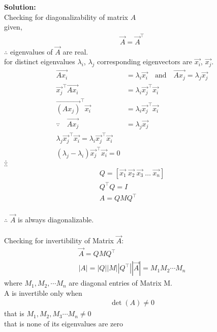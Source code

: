 \documentclass[journal]{IEEEtran}
\begin{document}
\textbf{Solution:}\\
Checking for diagonalizability of matrix $A$ \\
given,
\begin{align}
\vec{A} = \vec{A}^\top
\end{align}
$\therefore$ eigenvalues of $\vec{A}$ are real.\\
for distinct eigenvalues $\lambda_i$, $\lambda_j$ corresponding eigenvectors are $\vec{x_i}$, $\vec{x_j}$.
\begin{align}
\vec{Ax_i} &= \lambda_i \vec{x_i} \quad \text{and} \quad \vec{Ax_j} = \lambda_j \vec{x_j} 
\\\vec{x_j}^\top \vec{A x_i} &= \lambda_i \vec{x_j}^\top \vec{x_i} \\
\vec{(Ax_j)}^\top \vec{x_i} &= \lambda_i \vec{x_j}^\top \vec{x_i}\\
\because \quad \vec{Ax_j} &= \lambda_j \vec{x_j}\\
\lambda_j \vec{x_j}^\top \vec{x_i} = \lambda_i \vec{x_j}^\top \vec{x_i}\\
(\lambda_j - \lambda_i) \vec{x_j}^\top \vec{x_i} = 0
\end{align}
$\therefore$ \\
$\therefore$ \\
\begin{align}
Q = [\vec{x_1} \ \vec{x_2} \ \vec{x_3} \ \dots \ \vec{x_n}] \\
Q^\top Q = I\\
A = Q MQ^\top
\end{align}
\\
$\therefore$ $\vec{A}$ is always diagonalizable.\\\\
Checking for invertibility of Matrix  $\vec{A}$:
\begin{align}
\vec{A} = Q M Q^\top \\|A| = |Q| |M| |Q^\top|
|\vec{A}| = M_1 M_2 \cdots M_n
\end{align}
where $M_1, M_2, \cdots M_n$ are diagonal entries of Matrix M.\\
A is invertible only when 
\begin{align}
\det(A) \neq 0 
\end{align}
that is $M_1, M_2, M_3 \cdots M_n \neq 0$ \\
that is none of its eigenvalues are zero \\
\end{document}
